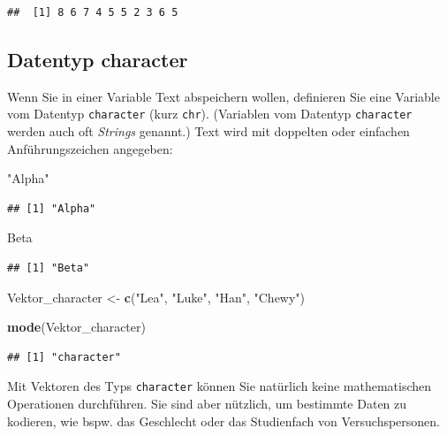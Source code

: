 \documentclass[
  ngerman,
]{book}
\newenvironment{Shaded}{\begin{snugshade}}{\end{snugshade}}
\newcommand{\FunctionTok}[1]{\textcolor[rgb]{0.13,0.29,0.53}{\textbf{#1}}}
\newcommand{\NormalTok}[1]{#1}
\newcommand{\OtherTok}[1]{\textcolor[rgb]{0.56,0.35,0.01}{#1}}
\newcommand{\StringTok}[1]{\textcolor[rgb]{0.31,0.60,0.02}{#1}}
\begin{document}
\begin{verbatim}
##  [1] 8 6 7 4 5 5 2 3 6 5
\end{verbatim}

\subsection{Datentyp character}\label{datentyp-character}

Wenn Sie in einer Variable Text abspeichern wollen, definieren Sie eine Variable vom Datentyp \texttt{character} (kurz \texttt{chr}). (Variablen vom Datentyp \texttt{character} werden auch oft \emph{Strings} genannt.) Text wird mit doppelten oder einfachen Anführungszeichen angegeben:

\begin{Shaded}
\begin{Highlighting}[]
\StringTok{"Alpha"} 
\end{Highlighting}
\end{Shaded}

\begin{verbatim}
## [1] "Alpha"
\end{verbatim}

\begin{Shaded}
\begin{Highlighting}[]
\StringTok{\textquotesingle{}Beta\textquotesingle{}}
\end{Highlighting}
\end{Shaded}

\begin{verbatim}
## [1] "Beta"
\end{verbatim}

\begin{Shaded}
\begin{Highlighting}[]
\NormalTok{Vektor\_character }\OtherTok{\textless{}{-}} \FunctionTok{c}\NormalTok{(}\StringTok{"Lea"}\NormalTok{, }\StringTok{"Luke"}\NormalTok{, }\StringTok{"Han"}\NormalTok{, }\StringTok{"Chewy"}\NormalTok{) }

\FunctionTok{mode}\NormalTok{(Vektor\_character)}
\end{Highlighting}
\end{Shaded}

\begin{verbatim}
## [1] "character"
\end{verbatim}

Mit Vektoren des Typs \texttt{character} können Sie natürlich keine mathematischen Operationen durchführen. Sie sind aber nützlich, um bestimmte Daten zu kodieren, wie bspw. das Geschlecht oder das Studienfach von Versuchspersonen.
\end{document}
